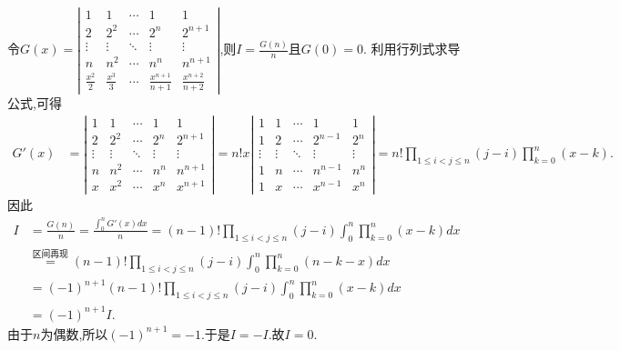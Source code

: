 \documentclass[../../main.tex]{subfiles}
\begin{document}
\begin{solution}
令\(G(x)=\left|\begin{matrix}
1 & 1 & \cdots & 1 & 1\\
2 & 2^2 & \cdots & 2^n & 2^{n + 1}\\
\vdots & \vdots & \ddots & \vdots & \vdots\\
n & n^2 & \cdots & n^n & n^{n + 1}\\
\frac{x^2}{2} & \frac{x^3}{3} & \cdots & \frac{x^{n + 1}}{n + 1} & \frac{x^{n + 2}}{n + 2}
\end{matrix}\right|\),则\(I = \frac{G(n)}{n}\)且\(G(0) = 0\).      
利用行列式求导公式,可得
\begin{align*}
G'(x)&=\left|\begin{matrix}
1 & 1 & \cdots & 1 & 1\\
2 & 2^2 & \cdots & 2^n & 2^{n + 1}\\
\vdots & \vdots & \ddots & \vdots & \vdots\\
n & n^2 & \cdots & n^n & n^{n + 1}\\
x & x^2 & \cdots & x^n & x^{n + 1}
\end{matrix}\right|
= n!x\left|\begin{matrix}
1 & 1 & \cdots & 1 & 1\\
1 & 2 & \cdots & 2^{n - 1} & 2^n\\
\vdots & \vdots & \ddots & \vdots & \vdots\\
1 & n & \cdots & n^{n - 1} & n^n\\
1 & x & \cdots & x^{n - 1} & x^n
\end{matrix}\right|
= n!\prod_{1\leqslant i < j\leqslant n}(j - i)\prod_{k = 0}^{n}(x - k).
\end{align*}
因此
\begin{align*}
I &= \frac{G(n)}{n}=\frac{\int_{0}^{n}G'(x)dx}{n}=(n - 1)!\prod_{1\leqslant i < j\leqslant n}(j - i)\int_{0}^{n}\prod_{k = 0}^{n}(x - k)dx
\\
&\stackrel{\text{区间再现}}{=}(n - 1)!\prod_{1\leqslant i < j\leqslant n}(j - i)\int_{0}^{n}\prod_{k = 0}^{n}(n - k - x)dx
\\
&= (-1)^{n + 1}(n - 1)!\prod_{1\leqslant i < j\leqslant n}(j - i)\int_{0}^{n}\prod_{k = 0}^{n}(x - k)dx
\\
&= (-1)^{n + 1}I.
\end{align*}      
由于\(n\)为偶数,所以\((-1)^{n + 1} = -1\).于是\(I = -I\).故\(I = 0\). 
\end{solution}
\end{document}
